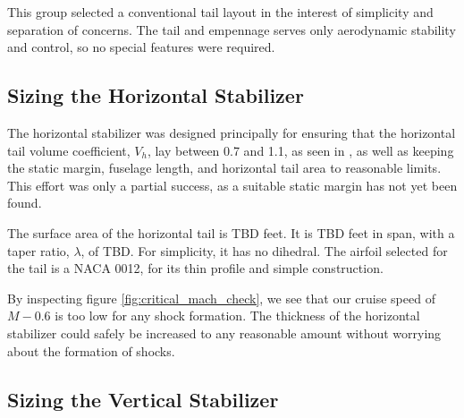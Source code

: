 \documentclass[conf]{new-aiaa}
\begin{document}
This group selected a conventional tail layout in the interest of simplicity and separation of concerns. The tail and empennage serves only aerodynamic stability and control, so no special features were required.

\subsection{Sizing the Horizontal Stabilizer} %

The horizontal stabilizer was designed principally for ensuring that the horizontal tail volume coefficient, $V_h$, lay between 0.7 and 1.1, as seen in \cite{orange_book}, as well as keeping the static margin, fuselage length, and horizontal tail area to reasonable limits. This effort was only a partial success, as a suitable static margin has not yet been found. 


The surface area of the horizontal tail is TBD feet. It is TBD feet in span, with a taper ratio, $\lambda$, of TBD. For simplicity, it has no dihedral. The airfoil selected for the tail is a NACA 0012, for its thin profile and simple construction.

By inspecting figure \ref{fig:critical_mach_check}, we see that our cruise speed of $M-0.6$ is too low for any shock formation. The thickness of the horizontal stabilizer could safely be increased to any reasonable amount without worrying about the formation of shocks.

\subsection{Sizing the Vertical Stabilizer}
\end{document}

